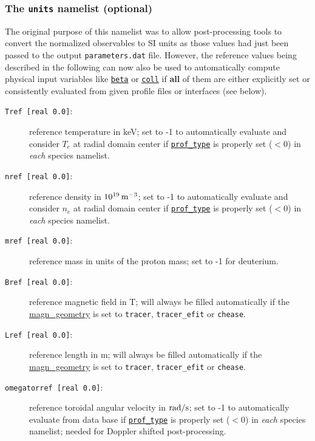 \documentclass[12pt]{article}
\begin{document}
\subsubsection{{The \texttt{units} namelist (optional)}}\label{sec:units_nml}
\hypertarget{units_nml}{}
The original purpose of this namelist was to allow post-processing tools to convert the normalized observables
to SI units as those values had just been passed to the output \texttt{parameters.dat} file.
However, the reference values being described in the following can now also be used to automatically
compute physical input variables like \hyperlink{beta}{\tt beta} or \hyperlink{coll}{\tt coll} if {\bf all} of them
are either explicitly set or consistently evaluated from given profile files or interfaces (see below).
\begin{description}
\item[\texttt{Tref [real 0.0]}:] reference temperature in keV; set to -1 to automatically evaluate and consider $T_e$
at radial domain center if \hyperlink{prof_type}{\tt prof\_type} is properly set ($<0$) in {\em each} species namelist.
\item[\texttt{nref [real 0.0]}:] reference density in $10^{19}\,{\rm m}^{-3}$; set to -1 to automatically evaluate and
consider $n_e$ at radial domain center if \hyperlink{prof_type}{\tt prof\_type} is properly set ($<0$) in {\em each} species namelist.
\item[\texttt{mref [real 0.0]}:] reference mass in units of the proton mass; set to -1 for deuterium.
\item[\texttt{Bref [real 0.0]}:] reference magnetic field in T; will always be filled automatically if the
\hyperlink{magn_geometry}{magn\_geometry} is set to \texttt{tracer}, \texttt{tracer\_efit} or \texttt{chease}.
\item[\texttt{Lref [real 0.0]}:] reference length in m; will always be filled automatically if the
\hyperlink{magn_geometry}{magn\_geometry} is set to \texttt{tracer}, \texttt{tracer\_efit} or \texttt{chease}.
\item[\hypertarget{omegatorref}{\texttt{omegatorref [real 0.0]}}:] reference toroidal angular velocity in ${\rm rad}/{\rm s}$;
set to -1 to automatically evaluate from data base if \hyperlink{prof_type}{\tt prof\_type} is properly set ($<0$) in {\em each}
species namelist; needed for Doppler shifted post-processing.
\end{description}
%
\end{document}
